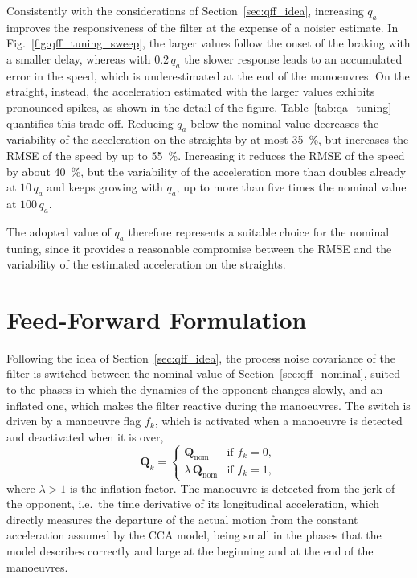 Consistently with the considerations of Section~\ref{sec:qff_idea}, increasing $q_a$ improves
the responsiveness of the filter at the expense of a noisier estimate. In
Fig.~\ref{fig:qff_tuning_sweep}, the larger values follow the onset of the braking with a smaller
delay, whereas with $0.2\,q_a$ the slower response leads to an accumulated error in the speed,
which is underestimated at the end of the manoeuvres. On the straight, instead, the acceleration
estimated with the larger values exhibits pronounced spikes, as shown in the detail of the figure.
Table~\ref{tab:qa_tuning} quantifies this trade-off. Reducing $q_a$ below the nominal value
decreases the variability of the acceleration on the straights by at most \SI{35}{\percent}, but
increases the RMSE of the speed by up to \SI{55}{\percent}. Increasing it reduces the RMSE of the
speed by about \SI{40}{\percent}, but the variability of the acceleration more than doubles
already at $10\,q_a$ and keeps growing with $q_a$, up to more than five times the nominal value
at $100\,q_a$.

The adopted value of $q_a$ therefore represents a suitable choice for the nominal tuning, since
it provides a reasonable compromise between the RMSE and the variability of the estimated
acceleration on the straights.

\section{Feed-Forward Formulation}
\label{sec:qff_formulation}

Following the idea of Section~\ref{sec:qff_idea}, the process noise covariance of the filter is
switched between the nominal value of Section~\ref{sec:qff_nominal}, suited to the phases in
which the dynamics of the opponent changes slowly, and an inflated one, which makes the filter
reactive during the manoeuvres. The switch is driven by a manoeuvre flag $f_k$, which is
activated when a manoeuvre is detected and deactivated when it is over,
\begin{equation}
    \mathbf{Q}_k =
    \begin{cases}
        \mathbf{Q}_{\mathrm{nom}} & \text{if } f_k = 0, \\
        \lambda\,\mathbf{Q}_{\mathrm{nom}} & \text{if } f_k = 1,
    \end{cases}
    \label{eq:qff_switch}
\end{equation}
where $\lambda > 1$ is the inflation factor. The manoeuvre is detected from the jerk of the
opponent, i.e.\ the time derivative of its longitudinal acceleration, which directly measures
the departure of the actual motion from the constant acceleration assumed by the CCA model,
being small in the phases that the model describes correctly and large at the beginning and at
the end of the manoeuvres.

